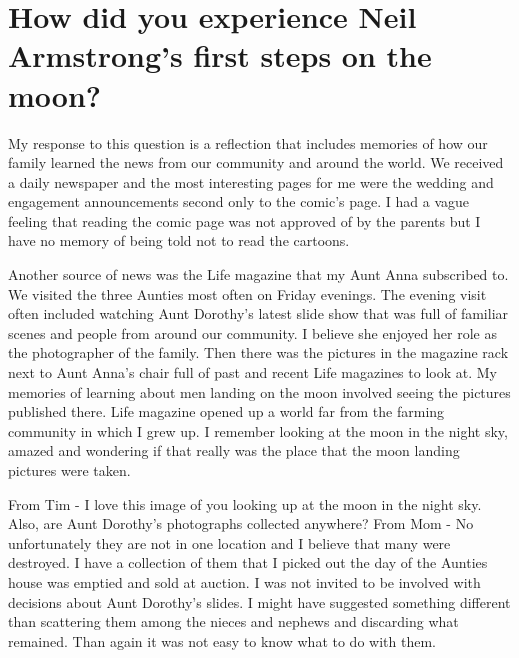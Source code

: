 \section{How did you experience Neil Armstrong's first steps on the moon?}
My response to this question is a reflection that includes memories of how our family learned the news from our community and around the world.
We received a daily newspaper and the most interesting pages for me were the wedding and engagement announcements second only to the comic's page.
I had a vague feeling that reading the comic page was not approved of by the parents but I have no memory of being told not to read the cartoons.

Another source of news was the Life magazine that my Aunt Anna subscribed to.
We visited the three Aunties most often on Friday evenings.
The evening visit often included watching Aunt Dorothy's latest slide show that was full of familiar scenes and people from around our community.
I believe she enjoyed her role as the photographer of the family.
Then there was the pictures in the magazine rack next to Aunt Anna's chair full of past and recent Life magazines to look at.
My memories of learning about men landing on the moon involved seeing the pictures published there.
Life magazine opened up a world far from the farming community in which I grew up.
I remember looking at the moon in the night sky, amazed and wondering if that really was the place that the moon landing pictures were taken.

From Tim - I love this image of you looking up at the moon in the night sky.
Also, are Aunt Dorothy's photographs collected anywhere?
From Mom - No unfortunately they are not in one location and I believe that many were destroyed.
I have a collection of them that I picked out the day of the Aunties house was emptied and sold at auction.
I was not invited to be involved with decisions about Aunt Dorothy's slides.
I might have suggested something different than scattering them among the nieces and nephews and discarding what remained.
Than again it was not easy to know what to do with them.






